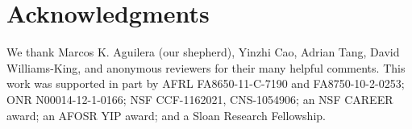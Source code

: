 \section*{Acknowledgments}

We thank Marcos K. Aguilera (our shepherd), Yinzhi Cao, Adrian Tang, David 
Williams-King, and anonymous reviewers for their many helpful comments. This 
work was supported in part by AFRL FA8650-11-C-7190 and FA8750-10-2-0253; ONR 
N00014-12-1-0166; NSF CCF-1162021, CNS-1054906; an NSF CAREER award; an AFOSR 
YIP award; and a Sloan Research Fellowship.
